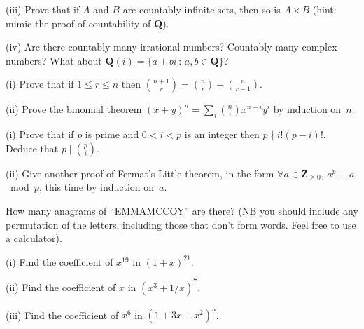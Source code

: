 \documentclass[10pt]{article}
\newcommand{\Q}{\mathbf{Q}}
\newcommand{\Z}{\mathbf{Z}}
\begin{document}
(iii) Prove that if $A$ and $B$ are countably infinite sets, then so is $A\times B$ (hint: mimic the proof of countability of $\Q$).

(iv) Are there countably many irrational numbers? Countably many complex numbers? What about $\Q(i)=\{a+bi\,:\,a,b\in\Q\}$?

\medskip{} (i) Prove that if $1\leq r\leq n$ then $\binom{n+1}{r}=\binom{n}{r}+\binom{n}{r-1}$.

(ii) Prove the binomial theorem $(x+y)^n=\sum_i \binom{n}{i}x^{n-i}y^i$ by induction on~$n$.

\medskip{} (i) Prove that if $p$ is prime and $0<i<p$ is an integer then $p\nmid i!(p-i)!$. Deduce that $p\mid \binom{p}{i}$.

(ii) Give another proof of Fermat's Little theorem, in the form $\forall a\in\Z_{\geq0}$, $a^p\equiv a$~mod~$p$, this time by induction on~$a$. 

\medskip{} How many anagrams of ``EMMAMCCOY'' are there? (NB you should include any permutation of the letters, including those that don't form words. Feel free to use a calculator).

\medskip{} (i) Find the coefficient of $x^{19}$ in $(1+x)^{21}$.

(ii) Find the coefficient of $x$ in $(x^3+1/x)^7$.

(iii) Find the coefficient of $x^6$ in $(1+3x+x^2)^5$.
\end{document}
